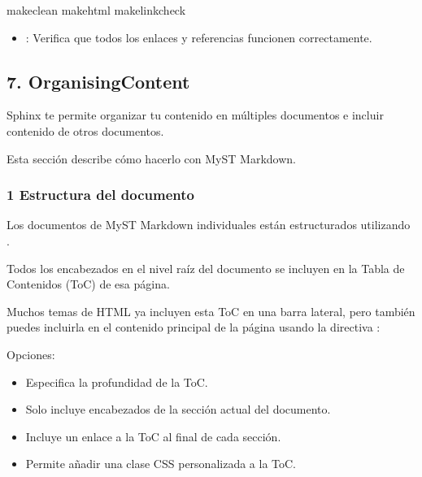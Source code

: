 \documentclass[a4paper,10pt,spanish]{sphinxmanual}
\begin{document}
\begin{sphinxVerbatim}[commandchars=\\\{\}]
makeclean
makehtml
makelinkcheck
\end{sphinxVerbatim}
\begin{itemize}
\item {} 
\sphinxAtStartPar
{}: Verifica que todos los enlaces y referencias funcionen correctamente.

\end{itemize}


\subsection{7. Organising\sphinxhyphen{}Content}
\label{\detokenize{configuracion_inicial/013.guia_de_myst_parser:organising-content}}
\sphinxAtStartPar
Sphinx te permite organizar tu contenido en múltiples documentos e incluir contenido de otros documentos.

\sphinxAtStartPar
Esta sección describe cómo hacerlo con MyST Markdown.


\subsubsection{1 Estructura del documento}
\label{\detokenize{configuracion_inicial/013.guia_de_myst_parser:estructura-del-documento}}
\sphinxAtStartPar
Los documentos de MyST Markdown individuales están estructurados utilizando {\hyperref[\detokenize{configuracion_inicial/013.guia_de_myst_parser:tipografia.md:encabezados}]{}}.

\sphinxAtStartPar
Todos los encabezados en el nivel raíz del documento se incluyen en la Tabla de Contenidos (ToC) de esa página.

\sphinxAtStartPar
Muchos temas de HTML ya incluyen esta ToC en una barra lateral, pero también puedes incluirla en el contenido principal de la página usando la directiva :

\sphinxAtStartPar
Opciones:
\begin{itemize}
\item {} 
\sphinxAtStartPar
{} Especifica la profundidad de la ToC.

\item {} 
\sphinxAtStartPar
{} Solo incluye encabezados de la sección actual del documento.

\item {} 
\sphinxAtStartPar
{} Incluye un enlace a la ToC al final de cada sección.

\item {} 
\sphinxAtStartPar
{} Permite añadir una clase CSS personalizada a la ToC.

\end{itemize}
\end{document}
